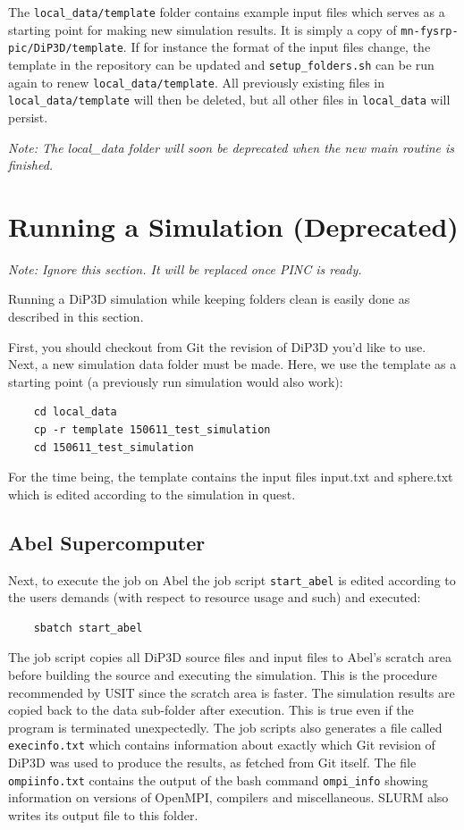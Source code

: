 \documentclass[10pt,a4paper]{article}
\begin{document}
The \lstinline$local_data/template$ folder contains example input files which serves as a starting point for making new simulation results. It is simply a copy of \lstinline$mn-fysrp-pic/DiP3D/template$. If for instance the format of the input files change, the template in the repository can be updated and \lstinline$setup_folders.sh$ can be run again to renew \lstinline$local_data/template$. All previously existing files in \lstinline$local_data/template$ will then be deleted, but all other files in \lstinline$local_data$ will persist.

\emph{Note: The local\_data folder will soon be deprecated when the new main routine is finished.}

\section{Running a Simulation (Deprecated)}
\emph{Note: Ignore this section. It will be replaced once PINC is ready.}

Running a DiP3D simulation while keeping folders clean is easily done as described in this section.

First, you should checkout from Git the revision of DiP3D you'd like to use. Next, a new simulation data folder must be made. Here, we use the template as a starting point (a previously run simulation would also work):

\begin{lstlisting}
	cd local_data
	cp -r template 150611_test_simulation
	cd 150611_test_simulation
\end{lstlisting}
For the time being, the template contains the input files input.txt and sphere.txt which is edited according to the simulation in quest.

\subsection{Abel Supercomputer}
Next, to execute the job on Abel the job script \lstinline$start_abel$ is edited according to the users demands (with respect to resource usage and such) and executed:

\begin{lstlisting}
	sbatch start_abel
\end{lstlisting}

The job script copies all DiP3D source files and input files to Abel's scratch area before building the source and executing the simulation. This is the procedure recommended by USIT since the scratch area is faster. The simulation results are copied back to the data sub-folder after execution. This is true even if the program is terminated unexpectedly. The job scripts also generates a file called \lstinline$execinfo.txt$ which contains information about exactly which Git revision of DiP3D was used to produce the results, as fetched from Git itself. The file \lstinline$ompiinfo.txt$ contains the output of the bash command \lstinline$ompi_info$ showing information on versions of OpenMPI, compilers and miscellaneous. SLURM also writes its output file to this folder.
\end{document}
